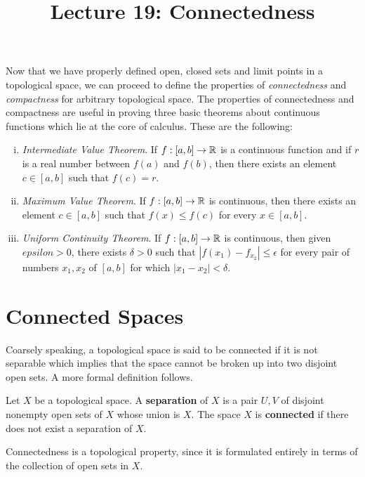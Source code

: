 \documentclass[a4paper,english,12pt]{article}
\title{Lecture 19: Connectedness}
\author{}
\begin{document}
\maketitle

Now that we have properly defined open, closed sets and limit points in a topological space, we can proceed to define the properties of 
\textit{connectedness} and \textit{compactness} for arbitrary topological space. The properties of connectedness and compactness are useful in proving 
three basic theorems about continuous functions which lie at the core of calculus. These are the following:

\begin{enumerate} [i)]
 \item \textit{Intermediate Value Theorem}.  If $f:[a, b] \to \mathbb{R}$ is a continuous function and if $r$ is a real number between $f(a)$ and $f(b)$, then 
 there exists an element $c \in [a, b]$ such that $f(c) = r$.
 
 \item \textit{Maximum Value Theorem}. If $f:[a,b] \to \mathbb{R}$ is continuous, then there exists an element $c \in [a, b]$ such that $f(x) \le f(c)$
 for every $x \in [a, b]$.
 
 \item \textit{Uniform Continuity Theorem}. If $f:[a,b] \to \mathbb{R}$ is continuous, then given $epsilon > 0$, there exists $\delta > 0$ 
 such that $|f(x_{1}) - f_{x_{2}}| \le \epsilon$ for every pair of numbers $x_{1}, x_{2}$ of $[a, b]$ for which $|x_{1} - x_{2}| < \delta$.
\end{enumerate}


\section{Connected Spaces}

Coarsely speaking, a topological space is said to be connected if it is not separable which implies that the space cannot be broken up into two disjoint open sets.
A more formal definition follows.

\begin{defn} 
Let $X$ be a topological space. A \textbf{separation} of $X$ is a pair $U, V$ of disjoint nonempty open sets of $X$ whose union is $X$.
The space $X$ is \textbf{connected} if there does not exist a separation of $X$. 
\end{defn}

Connectedness is a topological property, since it is formulated entirely in terms of the collection of open sets in $X$. 
\end{document}

